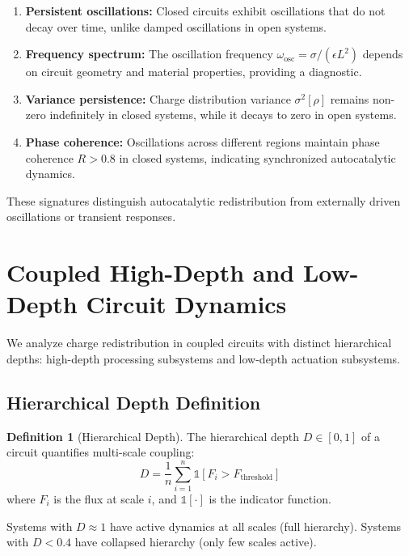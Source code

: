 \documentclass[12pt,a4paper]{article}
\theoremstyle{plain}
\theoremstyle{definition}
\newtheorem{definition}[theorem]{Definition}
\theoremstyle{remark}
\begin{document}
\begin{enumerate}
\item \textbf{Persistent oscillations:} Closed circuits exhibit oscillations that do not decay over time, unlike damped oscillations in open systems.

\item \textbf{Frequency spectrum:} The oscillation frequency $\omega_{\text{osc}} = \sigma / (\epsilon L^2)$ depends on circuit geometry and material properties, providing a diagnostic.

\item \textbf{Variance persistence:} Charge distribution variance $\sigma^2[\rho]$ remains non-zero indefinitely in closed systems, while it decays to zero in open systems.

\item \textbf{Phase coherence:} Oscillations across different regions maintain phase coherence $R > 0.8$ in closed systems, indicating synchronized autocatalytic dynamics.
\end{enumerate}

These signatures distinguish autocatalytic redistribution from externally driven oscillations or transient responses.
\section{Coupled High-Depth and Low-Depth Circuit Dynamics}
\label{sec:coupled_depth}

We analyze charge redistribution in coupled circuits with distinct hierarchical depths: high-depth processing subsystems and low-depth actuation subsystems.

\subsection{Hierarchical Depth Definition}

\begin{definition}[Hierarchical Depth]
\label{def:hierarchical_depth}
The hierarchical depth $D \in [0,1]$ of a circuit quantifies multi-scale coupling:
\begin{equation}
D = \frac{1}{n} \sum_{i=1}^{n} \mathbb{1}[F_i > F_{\text{threshold}}]
\end{equation}
where $F_i$ is the flux at scale $i$, and $\mathbb{1}[\cdot]$ is the indicator function.
\end{definition}

Systems with $D \approx 1$ have active dynamics at all scales (full hierarchy). Systems with $D < 0.4$ have collapsed hierarchy (only few scales active).
\end{document}
